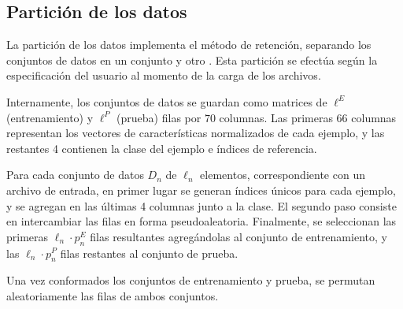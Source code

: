%
%
%
\subsection{Partición de los datos}
%
La partición de los datos implementa el método de retención, separando
los conjuntos de datos en un conjunto  y otro
. Esta partición se efectúa según la especificación del
usuario al momento de la carga de los archivos.

Internamente, los conjuntos de datos se guardan como matrices de
$\ell^E$ (entrenamiento) y $\ell^P$ (prueba) filas por $70$ columnas.
Las primeras $66$ columnas representan los vectores de características
normalizados de cada ejemplo, y las restantes 4 contienen la clase del
ejemplo e índices de referencia.

Para cada conjunto de datos $D_n$ de $\ell_n$ elementos,
correspondiente con un archivo de entrada, en primer lugar se generan
índices únicos para cada ejemplo, y se agregan en las últimas 4
columnas junto a la clase.  El segundo paso consiste en intercambiar
las filas en forma pseudoaleatoria.  Finalmente, se seleccionan las
primeras $\ell_n\cdot{}p_n^E$ filas resultantes agregándolas al
conjunto de entrenamiento, y las $\ell_n\cdot{}p_n^P$ filas restantes
al conjunto de prueba.

Una vez conformados los conjuntos de entrenamiento y prueba,
se permutan aleatoriamente las filas de ambos conjuntos.




